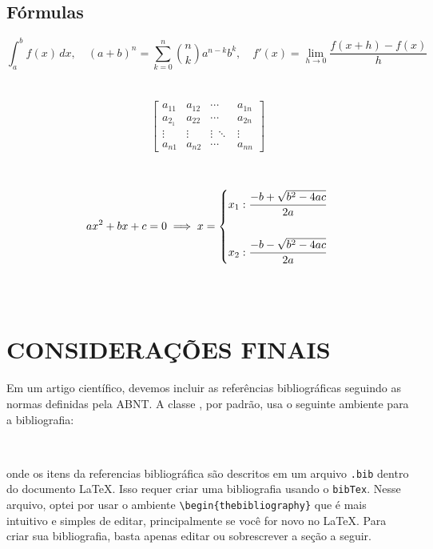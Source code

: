 \documentclass[
article,			%
12pt,				%
oneside,			%
a4paper,			%
english,			%
brazil,				%
sumario=tradicional
]{abntex2}
\begin{document}
    \subsection{Fórmulas}

\begin{equation}
    \int_{a}^{b} f(x) \, dx, \quad (a+b)^n= \sum\limits_{k=0}^n \binom{n}{k} a^{n-k} b^{k}, \quad f'(x)= \lim\limits_{h \to 0} \dfrac{f(x+h)- f(x)}{h}
\end{equation} \\\\

    \begin{equation}
    \left[
    \begin{array}{cccc}

        a_{11}  & a_{12} & \cdots & a_{1n}  \\
        a_{2_1} & a_{22} & \cdots & a_{2n} \\ 
        \vdots & \vdots & \vdots ~ \ddots & \vdots \\
        a_{n1} & a_{n2} & \cdots & a_{nn}
    \end{array}
    \right]
    \end{equation} \\\\
    
    \begin{equation}
        ax^2+bx+c=0 \implies x= \begin{dcases*}
        x_1: \dfrac{-b + \sqrt{b^2-4ac} }{2a} \\\\ 
        x_2: \dfrac{-b- \sqrt{b^2-4ac}}{2a}
        \end{dcases*}
    \end{equation} \\\\



    \section{CONSIDERAÇÕES FINAIS}

    Em um artigo científico, devemos incluir as referências bibliográficas seguindo as normas definidas pela ABNT. A classe \abnTeX, por padrão, usa o seguinte ambiente para a bibliografia: 
    
      \begin{verbatim}
          
      \end{verbatim}  
    onde os itens da referencias bibliográfica são descritos em um arquivo \texttt{.bib} dentro do documento \LaTeX. Isso requer criar uma bibliografia usando o \texttt{bibTex}. Nesse arquivo, optei por usar o ambiente \verb|\begin{thebibliography}| que é mais intuitivo e simples de editar, principalmente se você for novo no \LaTeX. Para criar sua bibliografia, basta apenas editar ou sobrescrever a seção a seguir.
\end{document}

